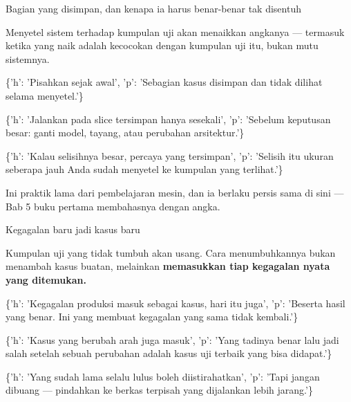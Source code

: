 \documentclass[aspectratio=169,11pt,t]{beamer}
\begin{document}
\begin{frame}[shrink=25]{Bagian yang disimpan, dan kenapa ia harus benar-benar tak disentuh}
{\fontsize{9.4}{12.6}\selectfont\color{fg2}Menyetel sistem terhadap kumpulan uji akan menaikkan angkanya --- termasuk ketika yang naik adalah kecocokan dengan kumpulan uji itu, bukan mutu sistemnya.\par}\vskip 4pt
\begin{isteps}
\item \{'h': 'Pisahkan sejak awal', 'p': 'Sebagian kasus disimpan dan tidak dilihat selama menyetel.'\}
\item \{'h': 'Jalankan pada slice tersimpan hanya sesekali', 'p': 'Sebelum keputusan besar: ganti model, tayang, atau perubahan arsitektur.'\}
\item \{'h': 'Kalau selisihnya besar, percaya yang tersimpan', 'p': 'Selisih itu ukuran seberapa jauh Anda sudah menyetel ke kumpulan yang terlihat.'\}
\end{isteps}
\begin{iband}[signal]
Ini praktik lama dari pembelajaran mesin, dan ia berlaku persis sama di sini --- Bab 5 buku pertama membahasnya dengan angka.
\end{iband}
\end{frame}

\begin{frame}[shrink=25]{Kegagalan baru jadi kasus baru}
{\fontsize{9.4}{12.6}\selectfont\color{fg2}Kumpulan uji yang tidak tumbuh akan usang. Cara menumbuhkannya bukan menambah kasus buatan, melainkan \textbf{memasukkan tiap kegagalan nyata yang ditemukan.}\par}\vskip 4pt
\begin{isteps}
\item \{'h': 'Kegagalan produksi masuk sebagai kasus, hari itu juga', 'p': 'Beserta hasil yang benar. Ini yang membuat kegagalan yang sama tidak kembali.'\}
\item \{'h': 'Kasus yang berubah arah juga masuk', 'p': 'Yang tadinya benar lalu jadi salah setelah sebuah perubahan adalah kasus uji terbaik yang bisa didapat.'\}
\item \{'h': 'Yang sudah lama selalu lulus boleh diistirahatkan', 'p': 'Tapi jangan dibuang --- pindahkan ke berkas terpisah yang dijalankan lebih jarang.'\}
\end{isteps}
\end{frame}
\end{document}
